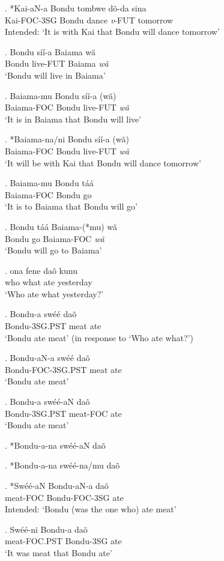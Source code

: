 \documentclass{assets/fieldnotes}
\begin{document}
\exg. *Kai-aN-a Bondu tombwe dõ-da sina\\
Kai-FOC-3SG Bondu dance \textit{v}-FUT tomorrow\\
Intended: `It is with Kai that Bondu will dance tomorrow'

\ex. Bondu síí-a Baiama wã\\
Bondu live-FUT Baiama \textit{wã}\\
`Bondu will live in Baiama'

\ex. Baiama-mu Bondu síí-a (wã)\\
Baiama-FOC Bondu live-FUT \textit{wã}\\
`It is in Baiama that Bondu will live'

\ex. *Baiama-na/ni Bondu síí-a (wã)\\
Baiama-FOC Bondu live-FUT \textit{wã}\\
`It will be with Kai that Bondu will dance tomorrow'

\ex. Baiama-mu Bondu táá\\
Baiama-FOC Bondu go\\
`It is to Baiama that Bondu will go'

\ex. Bondu táá Baiama-(*mu) wã\\
Bondu go Baiama-FOC \textit{wã}\\
`Bondu will go to Baiama'

\exg. \textipa{\textltailn}ona fene daõ kunu\\
who what ate yesterday\\
`Who ate what yesterday?'

\exg. Bondu-a swéé daõ\\
Bondu-3SG.PST meat ate\\
`Bondu ate meat' (in response to `Who ate what?')

\exg. Bondu-aN-a swéé daõ\\
Bondu-FOC-3SG.PST meat ate\\
`Bondu ate meat'

\exg. Bondu-a swéé-aN daõ\\
Bondu-3SG.PST meat-FOC ate\\
`Bondu ate meat'

\ex. *Bondu-a-na swéé-aN daõ

\ex. *Bondu-a-na swéé-na/mu daõ

\exg. *Swéé-aN Bondu-aN-a daõ\\
meat-FOC Bondu-FOC-3SG ate\\
Intended: `Bondu (was the one who) ate meat'

\ex. Swéé-ni Bondu-a daõ\\
meat-FOC.PST Bondu-3SG ate\\
`It was meat that Bondu ate'
\end{document}

